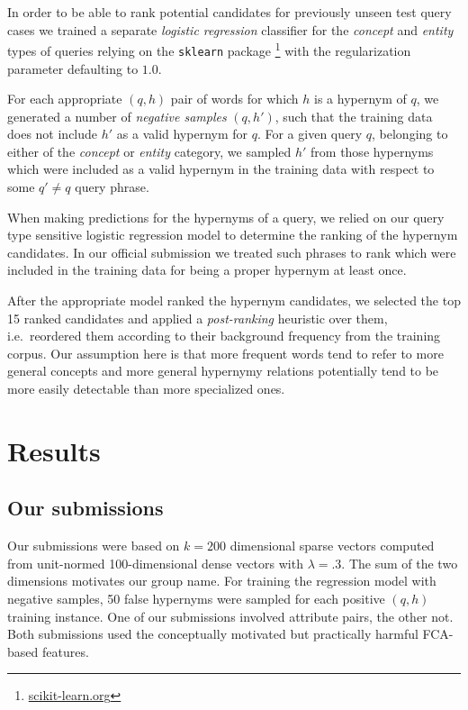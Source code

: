 \documentclass[11pt,a4paper]{article}
\begin{document}
In order to be able to rank potential candidates for previously unseen test
query cases we trained a separate \emph{logistic regression} classifier for the
\textit{concept} and \textit{entity} types of queries relying on the
\texttt{sklearn} package
\citep{Pedregosa:2011}\footnote{\url{scikit-learn.org}} with the regularization 
parameter defaulting to $1.0$.

For each appropriate $(q,h)$ pair of words for which
$h$ is a hypernym of $q$, we generated a number of \emph{negative samples} $(q, h')$,
such that the training data does not include $h'$ as a valid hypernym for $q$.
For a given query $q$, belonging to either of the \textit{concept} or
\textit{entity} category, we sampled $h'$ from those hypernyms which were
included as a valid hypernym in the training data with respect to some $q' \neq
q$ query phrase.

When making predictions for the hypernyms of a query, we relied on our query
type sensitive logistic regression model to determine the ranking of the
hypernym candidates. In our official submission we treated such
phrases to rank which were included in the training data for 
being a proper hypernym at least once.

After the appropriate model ranked the hypernym candidates, we selected
the top 15 ranked candidates and applied a \emph{post-ranking} heuristic over them,
i.e.~reordered them according to their background frequency from the training
corpus. Our assumption here is that more frequent words tend to refer to more
general concepts and more general hypernymy relations potentially tend to be
more easily detectable than more specialized ones.

\section{Results} \label{sec:results}

\subsection{Our submissions}

Our submissions were based on $k=200$ dimensional sparse vectors computed from
unit-normed 100-dimensional dense vectors with $\lambda=.3$. The sum of the two
dimensions motivates our group name. For training the regression model with
negative samples, 50 false hypernyms were sampled for each positive $(q,h)$ 
training instance. One
of our submissions involved attribute pairs, the other not. Both
submissions used the conceptually motivated but practically harmful FCA-based
features.
\end{document}
